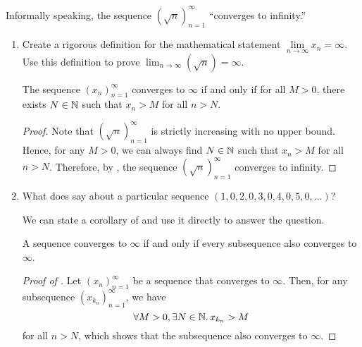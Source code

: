 \begin{problem}
  Informally speaking, the sequence $(\sqrt{n})_{n=1}^{\infty}$ ``converges to infinity.''

  \begin{enumerate}[label=(\alph*)]
      \item Create a rigorous definition for the mathematical statement $\lim\limits_{n \to \infty} x_{n} = \infty$. Use this
        definition to prove $\lim_{n \to \infty} (\sqrt{n}) = \infty$.

        \begin{definition}
          \label{def:convergence-to-infty}
          The sequence $(x_{n})_{n=1}^{\infty}$ converges to $\infty$ if and only if
          for all $M > 0$, there exists $N \in \mathbb{N}$ such that $x_{n} > M$ 
          for all $n > N$.
        \end{definition}

        \begin{proof}
          Note that $(\sqrt{n})_{n=1}^{\infty}$ is strictly increasing with no upper bound. 
          Hence, for any $M > 0$, we can always find $N \in \mathbb{N}$ such that $x_{n} > M$ for all $n > N$. 
          Therefore, by , the sequence $(\sqrt{n})_{n=1}^{\infty}$ 
          converges to infinity.
        \end{proof}

      \item What does  say about a particular sequence
        $(1, 0, 2, 0, 3, 0, 4, 0, 5, 0, \ldots)$?

      
        We can state a corollary of  and use it directly to answer
        the question.

        \begin{corollary}
          \label{cor:sequence-to-infty-iff-all-subeq-to-infty}
          A sequence converges to $\infty$ if and only if every subsequence also
          converges to $\infty$.
        \end{corollary}

        \begin{proof}[Proof of ]
          Let $(x_{n})_{n=1}^{\infty}$ be a sequence that converges to $\infty$.
          Then, for any subsequence $(x_{k_{n}})_{n=1}^{\infty}$, we have
          \[
            \forall M > 0, \exists N \in \mathbb{N}.\, x_{k_{n}} > M
          \]
          for all $n > N$, which shows that the subsequence also converges to $\infty$.


\end{proof}
\end{enumerate}
\end{problem}
